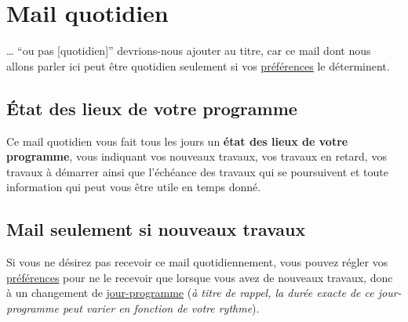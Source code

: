 % 
% 
% 
% 
% 
% 
% 
% 

\section{Mail quotidien}\hypertarget{mail-quotidien}{}\label{mail-quotidien}

… ``ou pas [quotidien]'' devrions-nous ajouter au titre, car ce mail dont nous allons parler ici peut être quotidien seulement si vos \hyperlink{preferences-auteur}{préférences} le déterminent.

\subsection{État des lieux de votre programme}\hypertarget{tat-des-lieux-de-votre-programme}{}\label{tat-des-lieux-de-votre-programme}

Ce mail quotidien vous fait tous les jours un \textbf{état des lieux de votre programme}, vous indiquant vos nouveaux travaux, vos travaux en retard, vos travaux à démarrer ainsi que l'échéance des travaux qui se poursuivent et toute information qui peut vous être utile en temps donné.

\subsection{Mail seulement si nouveaux travaux}\hypertarget{mail-seulement-si-nouveaux-travaux}{}\label{mail-seulement-si-nouveaux-travaux}

Si vous ne désirez pas recevoir ce mail quotidiennement, vous pouvez régler vos \hyperlink{preferences-auteur}{préférences} pour ne le recevoir que lorsque vous avez de nouveaux travaux, donc à un changement de \hyperlink{explicationjourprogrammejourreel}{jour-programme} (\emph{à titre de rappel, la durée exacte de ce jour-programme peut varier en fonction de votre rythme}).

